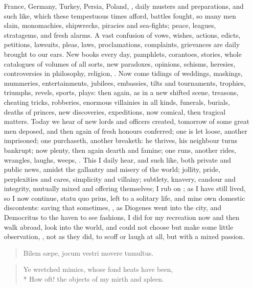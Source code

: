 {France, Germany, Turkey, Persia, Poland, \etc, daily musters and
preparations, and such like, which these tempestuous times afford,
battles fought, so many men slain, monomachies, shipwrecks, piracies
and sea-fights; peace, leagues, stratagems, and fresh alarms. A vast
confusion of vows, wishes, actions, edicts, petitions, lawsuits, pleas,
laws, proclamations, complaints, grievances are daily brought to our
ears. New books every day, pamphlets, corantoes, stories, whole
catalogues of volumes of all sorts, new paradoxes, opinions, schisms,
heresies, controversies in philosophy, religion, \etc. Now come tidings
of weddings, maskings, mummeries, entertainments, jubilees, embassies,
tilts and tournaments, trophies, triumphs, revels, sports, plays: then
again, as in a new shifted scene, treasons, cheating tricks, robberies,
enormous villainies in all kinds, funerals, burials, deaths of princes,
new discoveries, expeditions, now comical, then tragical matters. Today
we hear of new lords and officers created, tomorrow of some great men
deposed, and then again of fresh honours conferred; one is let loose,
another imprisoned; one purchaseth, another breaketh: he thrives, his
neighbour turns bankrupt; now plenty, then again dearth and famine; one
runs, another rides, wrangles, laughs, weeps, \etc. This I daily hear,
and such like, both private and public news, amidst the gallantry and
misery of the world; jollity, pride, perplexities and cares, simplicity
and villainy; subtlety, knavery, candour and integrity, mutually mixed
and offering themselves; I rub on ; as I have still
lived, so I now continue, statu quo prius, left to a solitary life, and
mine own domestic discontents: saving that sometimes, ,
as Diogenes went into the city, and Democritus to the haven to see
fashions, I did for my recreation now and then walk abroad, look into
the world, and could not choose but make some little observation, ,  not as they did, to
scoff or laugh at all, but with a mixed passion.

\begin{verse}
\textlatin{Bilem s\ae{}pe, jocum vestri movere tumultus}.
\end{verse}

\begin{verse}
Ye wretched mimics, whose fond heats have been,\\*
How oft! the objects of my mirth and spleen.
\end{verse}

}
